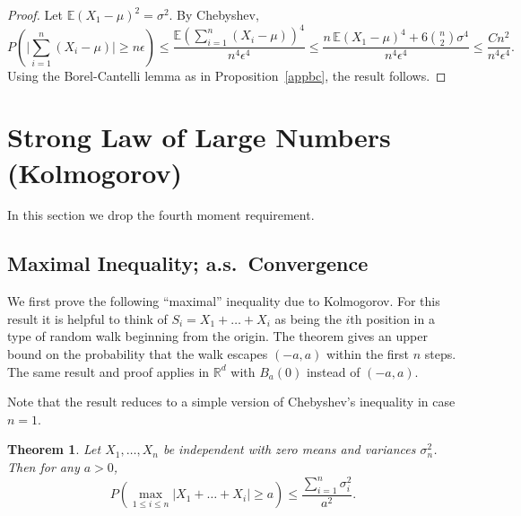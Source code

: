 \documentclass[a4paper]{amsart}
\theoremstyle{plain}
\newtheorem{theorem}{Theorem}[section]
\theoremstyle{definition}
\theoremstyle{remark}
\begin{document}
\begin{proof} Let $ \mathbb{E} (X_1-\mu)^2 = \sigma ^ 2 $.
By Chebyshev,
\[
P\left( \bigg| \sum_{i=1}^n (X_i - \mu) \bigg| \geq n \epsilon \right) 
\leq \frac{ \mathbb{E} \left( \sum_{i=1}^n (X_i - \mu )\right)^4} { n^4 \epsilon ^4 } 
   \leq \frac{ n\,  \mathbb{E} (X_1-\mu)^4  + 6 \binom{n}{2} \sigma ^4 } { n^4 \epsilon ^4 } \leq \frac{Cn^2}{n^4 \epsilon ^4}  .
   \]
Using the Borel-Cantelli lemma as in Proposition~\ref{appbc}, the result follows.
\end{proof} 


\section{Strong Law of Large Numbers (Kolmogorov)} 

In this section we drop the fourth moment requirement.

\subsection{Maximal Inequality; a.s.\ Convergence}

 We first prove the following ``maximal'' inequality due to Kolmogorov. 
For this result it is helpful to think of $ S_i = X_1+ \dots +   X_i $ as being the $ i$th position in a type of random walk beginning from the origin. The theorem gives an upper bound on the probability that the walk escapes $ (-a,a) $ within the first $ n $ steps. 
The same result and proof applies in $ \mathbb{R}^d  $ with $ B_a(0) $ instead of $ (-a,a) $.  

%
 

\medskip Note that the result reduces to a simple version of Chebyshev's inequality in case $ n=1 $.

\begin{theorem} Let $ X_1,\dots, X_n $ be independent with zero means and variances $ \sigma _n^2 $. Then for any $ a > 0 $, 
\[
P \left( \max_{1\leq i \leq n} |X_1+\dots+ X_i | \geq a \right) \leq \frac { \sum_{i=1}^n \sigma _i^2 } { a^2 }.
\]
\end{theorem} 
\end{document}
